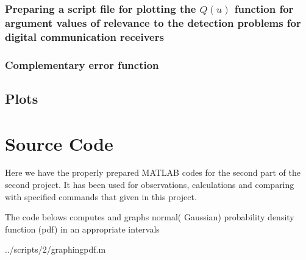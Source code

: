 \subsubsection{Preparing a script file for plotting the $Q(u)$ function for argument values of relevance to the detection problems for digital communication receivers  }



\subsubsection{Complementary error function}



\subsection{Plots}
\section{Source Code}
Here we have the properly prepared MATLAB codes for the second part of the second project. It has been used for observations, calculations and comparing with specified commands that given in this project.

The code belows computes and graphs normal( Gaussian) probability density function (pdf) in an appropriate intervals

\begin{lstinputlisting}[language=Octave]{../scripts/2/graphingpdf.m}
\end{lstinputlisting}
